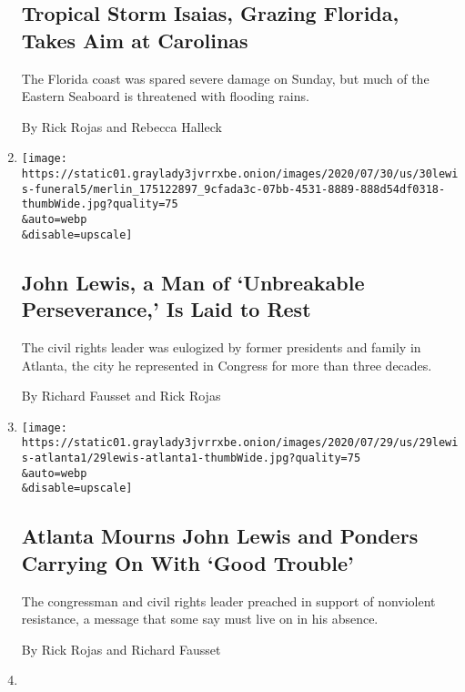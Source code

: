 \begin{enumerate}
{  \subsection{Tropical Storm Isaias, Grazing Florida, Takes Aim at
  Carolinas}\label{tropical-storm-isaias-grazing-florida-takes-aim-at-carolinas}}

  The Florida coast was spared severe damage on Sunday, but much of the
  Eastern Seaboard is threatened with flooding rains.

  By Rick Rojas and Rebecca Halleck
\item
  \href{/2020/07/30/us/john-lewis-live-funeral.html}{}

  \texttt{[image: https://static01.graylady3jvrrxbe.onion/images/2020/07/30/us/30lewis-funeral5/merlin\_175122897\_9cfada3c-07bb-4531-8889-888d54df0318-thumbWide.jpg?quality=75\\\&auto=webp\\\&disable=upscale]}

  \hypertarget{john-lewis-a-man-of-unbreakable-perseverance-is-laid-to-rest}{%
  \subsection{John Lewis, a Man of `Unbreakable Perseverance,' Is Laid
  to
  Rest}\label{john-lewis-a-man-of-unbreakable-perseverance-is-laid-to-rest}}

  The civil rights leader was eulogized by former presidents and family
  in Atlanta, the city he represented in Congress for more than three
  decades.

  By Richard Fausset and Rick Rojas
\item
  \href{/2020/07/29/us/john-lewis-atlanta-memorial.html}{}

  \texttt{[image: https://static01.graylady3jvrrxbe.onion/images/2020/07/29/us/29lewis-atlanta1/29lewis-atlanta1-thumbWide.jpg?quality=75\\\&auto=webp\\\&disable=upscale]}

  \hypertarget{atlanta-mourns-john-lewis-and-ponders-carrying-on-with-good-trouble}{%
  \subsection{Atlanta Mourns John Lewis and Ponders Carrying On With
  `Good
  Trouble'}\label{atlanta-mourns-john-lewis-and-ponders-carrying-on-with-good-trouble}}

  The congressman and civil rights leader preached in support of
  nonviolent resistance, a message that some say must live on in his
  absence.

  By Rick Rojas and Richard Fausset
\item
  \href{/2020/07/27/us/politics/jon-ossoff-david-perdue-ad.html}{}


\end{enumerate}
